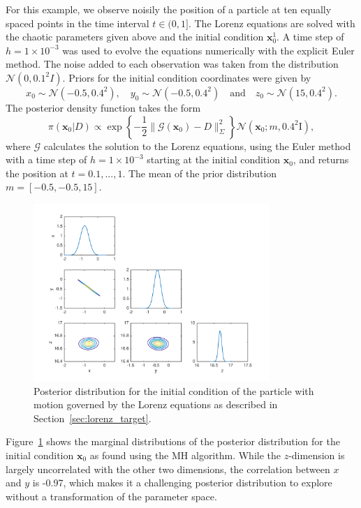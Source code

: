 \documentclass[final]{siamltex}
\newcommand{\revised}{}
\begin{document}
For this example, we observe noisily the position of a particle at ten
equally spaced points in the time interval $t \in (0, 1]$. The Lorenz
equations are solved with the chaotic parameters given above and the
initial condition $\mathbf{x}_0^1$. A time step of $h=1\times 10^{-3}$
was used to evolve the equations numerically with the explicit Euler
method. The noise added to each observation was taken from the
distribution {\revised $\mathcal{N}(0, 0.1^2I)$.} Priors for the initial condition
coordinates were given by
\[
	x_0 \sim \mathcal{N}(-0.5, 0.4^2), \quad y_0 \sim\mathcal{N}(-0.5, 0.4^2) \quad \text{and} \quad z_0 \sim \mathcal{N}(15, 0.4^2).
\]
The posterior density function takes the form
\[
	\pi(\mathbf{x}_0|D) \propto \exp\left\{-\frac{1}{2}\|\mathcal{G}(\mathbf{x}_0) - D\|^2_\Sigma\right\}\mathcal{N}(\mathbf{x}_0; m, 0.4^2\text{I}),
\]
where $\mathcal{G}$ calculates the solution to the Lorenz equations, using the Euler method with a time step of $h=1\times 10^{-3}$ starting at the initial condition $\mathbf{x}_0$, and returns the position at $t = 0.1, ..., 1$. The mean of the prior distribution $m = [-0.5, -0.5, 15]$.


\begin{figure}[htb]
\centering
\includegraphics[width=0.8\textwidth]{"figures/Lorenz_posterior_b"}
\caption{Posterior distribution for the initial condition of the particle with motion governed by the Lorenz equations as described in Section~\ref{sec:lorenz_target}.}
\label{fig:Lorenz_posterior}
\end{figure}

Figure~\ref{fig:Lorenz_posterior} shows the marginal distributions of
the posterior distribution for the initial condition $\mathbf{x}_0$ as
found using the MH algorithm. While the $z$-dimension is largely
uncorrelated with the other two dimensions, the correlation between
$x$ and $y$ is {\revised -0.97}, which makes it a challenging posterior distribution to explore without a transformation of the parameter space.
\end{document}
